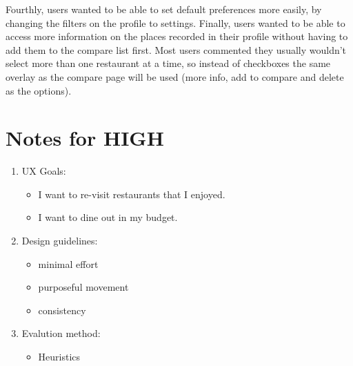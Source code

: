 \documentclass[a4 paper, 12pt]{article}
\begin{document}
    Fourthly, users wanted to be able to set default preferences more easily, by changing the filters on the profile to settings. Finally, users wanted to be able to access more information on the places recorded in their profile without having to add them to the compare list first. Most users commented they usually wouldn't select more than one restaurant at a time, so instead of checkboxes the same overlay as the compare page will be used (more info, add to compare and delete as the options).





    \section{Notes for HIGH}
    \begin{enumerate}
        \item UX Goals:
            \begin{itemize}
                \item I want to re-visit restaurants that I enjoyed.
                \item I want to dine out in my budget.
            \end{itemize}
        \item Design guidelines:
            \begin{itemize}
                \item minimal effort
                \item purposeful movement
                \item consistency
            \end{itemize}
        \item Evalution method:
            \begin{itemize}
                \item Heuristics
            \end{itemize}

    \end{enumerate}





    
\end{document}
